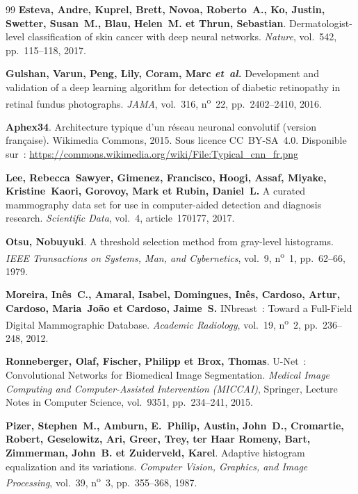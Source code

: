 \begin{thebibliography}{99}
\textbf{Esteva, Andre, Kuprel, Brett, Novoa, Roberto~A., Ko, Justin,
Swetter, Susan~M., Blau, Helen~M. et Thrun, Sebastian}.
Dermatologist-level classification of skin cancer with deep neural networks.
\textit{Nature}, vol.~542, pp.~115--118, 2017.

\textbf{Gulshan, Varun, Peng, Lily, Coram, Marc \textit{et~al.}}
Development and validation of a deep learning algorithm for detection
of diabetic retinopathy in retinal fundus photographs.
\textit{JAMA}, vol.~316, n\textsuperscript{o}~22, pp.~2402--2410, 2016.

\textbf{Aphex34}.
Architecture typique d'un r\'eseau neuronal convolutif (version fran\c{c}aise).
Wikimedia Commons, 2015. Sous licence CC~BY-SA~4.0.
Disponible sur~: \url{https://commons.wikimedia.org/wiki/File:Typical_cnn_fr.png}

\textbf{Lee, Rebecca~Sawyer, Gimenez, Francisco, Hoogi, Assaf,
Miyake, Kristine~Kaori, Gorovoy, Mark et Rubin, Daniel~L.}
A curated mammography data set for use in computer-aided detection
and diagnosis research.
\textit{Scientific Data}, vol.~4, article~170177, 2017.


\textbf{Otsu, Nobuyuki}.
A threshold selection method from gray-level histograms.
\textit{IEEE Transactions on Systems, Man, and Cybernetics},
vol.~9, n\textsuperscript{o}~1, pp.~62--66, 1979.

\textbf{Moreira, In\^es~C., Amaral, Isabel, Domingues, In\^es,
Cardoso, Artur, Cardoso, Maria~Jo\~ao et Cardoso, Jaime~S.}
INbreast~: Toward a Full-Field Digital Mammographic Database.
\textit{Academic Radiology}, vol.~19, n\textsuperscript{o}~2,
pp.~236--248, 2012.

\textbf{Ronneberger, Olaf, Fischer, Philipp et Brox, Thomas}.
U-Net~: Convolutional Networks for Biomedical Image Segmentation.
\textit{Medical Image Computing and Computer-Assisted Intervention (MICCAI)},
Springer, Lecture Notes in Computer Science, vol.~9351,
pp.~234--241, 2015.

\textbf{Pizer, Stephen~M., Amburn, E.~Philip, Austin, John~D.,
Cromartie, Robert, Geselowitz, Ari, Greer, Trey,
ter Haar Romeny, Bart, Zimmerman, John~B. et Zuiderveld, Karel}.
Adaptive histogram equalization and its variations.
\textit{Computer Vision, Graphics, and Image Processing}, vol.~39,
n\textsuperscript{o}~3, pp.~355--368, 1987.


\end{thebibliography}
